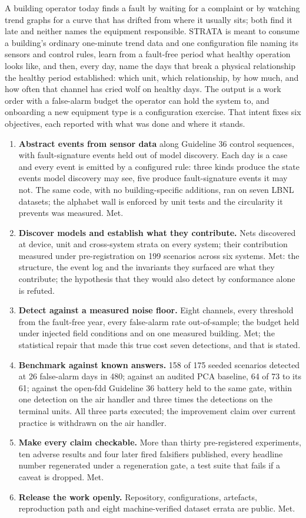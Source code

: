 \documentclass[11pt,letterpaper]{article}
\begin{document}
A building operator today finds a fault by waiting for a complaint or by watching trend graphs for a curve that has drifted from where it usually sits; both find it late and neither names the equipment responsible. STRATA is meant to consume a building's ordinary one-minute trend data and one configuration file naming its sensors and control rules, learn from a fault-free period what healthy operation looks like, and then, every day, name the days that break a physical relationship the healthy period established: which unit, which relationship, by how much, and how often that channel has cried wolf on healthy days. The output is a work order with a false-alarm budget the operator can hold the system to, and onboarding a new equipment type is a configuration exercise. That intent fixes six objectives, each reported with what was done and where it stands.

\begin{enumerate}
\item \textbf{Abstract events from sensor data} along Guideline 36 control sequences, with fault-signature events held out of model discovery. Each day is a case and every event is emitted by a configured rule: three kinds produce the state events model discovery may see, five produce fault-signature events it may not. The same code, with no building-specific additions, ran on seven LBNL datasets; the alphabet wall is enforced by unit tests and the circularity it prevents was measured. Met.
\item \textbf{Discover models and establish what they contribute.} Nets discovered at device, unit and cross-system strata on every system; their contribution measured under pre-registration on 199 scenarios across six systems. Met: the structure, the event log and the invariants they surfaced are what they contribute; the hypothesis that they would also detect by conformance alone is refuted.
\item \textbf{Detect against a measured noise floor.} Eight channels, every threshold from the fault-free year, every false-alarm rate out-of-sample; the budget held under injected field conditions and on one measured building. Met; the statistical repair that made this true cost seven detections, and that is stated.
\item \textbf{Benchmark against known answers.} 158 of 175 seeded scenarios detected at 26 false-alarm days in 480; against an audited PCA baseline, 64 of 73 to its 61; against the open-fdd Guideline 36 battery held to the same gate, within one detection on the air handler and three times the detections on the terminal units. All three parts executed; the improvement claim over current practice is withdrawn on the air handler.
\item \textbf{Make every claim checkable.} More than thirty pre-registered experiments, ten adverse results and four later fired falsifiers published, every headline number regenerated under a regeneration gate, a test suite that fails if a caveat is dropped. Met.
\item \textbf{Release the work openly.} Repository, configurations, artefacts, reproduction path and eight machine-verified dataset errata are public. Met.
\end{enumerate}
\end{document}

